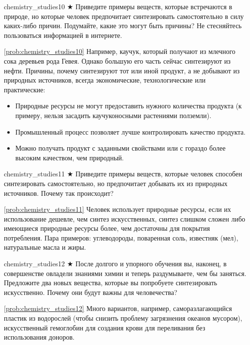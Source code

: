 \begin{problem}{}{chemistry_studies10}
    $\bigstar$ Приведите примеры веществ, которые встречаются в природе, но которые человек предпочитает синтезировать самостоятельно в силу каких-либо причин. Подумайте, какие это могут быть причины? Не стесняйтесь пользоваться информацией в интернете.

    \begin{sol}{\ref{prob:chemistry_studies10}}
        Например, каучук, который получают из млечного сока деревьев рода Гевея. Однако большую его часть сейчас синтезируют из нефти. Причины, почему синтезируют тот или иной продукт, а не добывают из природных источников, всегда экономические, технологические или практические:
        \begin{itemize}
            \item Природные ресурсы не могут предоставить нужного количества продукта (к примеру, нельзя засадить каучуконосными растениями полземли).
            \item Промышленный процесс позволяет лучше контролировать качество продукта.
            \item Можно получать продукт с заданными свойствами или с гораздо более высоким качеством, чем природный.
        \end{itemize}
    \end{sol}
\end{problem}

\begin{problem}{}{chemistry_studies11}
    $\bigstar$ Приведите примеры веществ, которые человек способен синтезировать самостоятельно, но предпочитает добывать их из природных источников. Почему так происходит?

    \begin{sol}{\ref{prob:chemistry_studies11}}
        Человек использует природные ресурсы, если их использование дешевле, чем синтез искусственных, синтез слишком сложен либо имеющиеся природные ресурсы более, чем достаточны для покрытия потребления. Пара примеров: углеводороды, поваренная соль, известняк (мел), натуральные масла и жиры.
    \end{sol}
\end{problem}

\begin{problem}{}{chemistry_studies12}
    $\bigstar$ После долгого и упорного обучения вы, наконец, в совершенстве овладели знаниями химии и теперь раздумываете, чем бы заняться. Предложите два новых вещества, которые вы попробуете синтезировать искусственно. Почему они будут важны для человечества?

    \begin{sol}{\ref{prob:chemistry_studies12}}
        Много вариантов, например, саморазлагающийся пластик из водорослей (чтобы снизить проблему загрязнения океанов мусором), искусственный гемоглобин для создания крови для переливания без использования доноров.
    \end{sol}
\end{problem}

